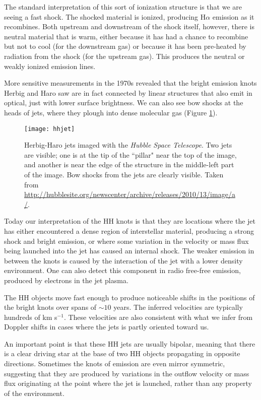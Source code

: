 The standard interpretation of this sort of ionization structure is that we are seeing a fast shock. The shocked material is ionized, producing H$\alpha$ emission as it recombines. Both upstream and downstream of the shock itself, however, there is neutral material that is warm, either because it has had a chance to recombine but not to cool (for the downstream gas) or because it has been pre-heated by radiation from the shock (for the upstream gas). This produces the neutral or weakly ionized emission lines.

More sensitive measurements in the 1970s revealed that the bright emission knots Herbig and Haro saw are in fact connected by linear structures that also emit in optical, just with lower surface brightness. We can also see bow shocks at the heads of jets, where they plough into dense molecular gas (Figure \ref{fig:hhjet}).

\begin{figure}
\texttt{[image: hhjet]}
\caption[Herbig-Haro jets from \textit{HST}]{
\label{fig:hhjet}
Herbig-Haro jets imaged with the \textit{Hubble Space Telescope}. Two jets are visible; one is at the tip of the ``pillar" near the top of the image, and another is near the edge of the structure in the middle-left part of the image. Bow shocks from the jets are clearly visible. Taken from \url{http://hubblesite.org/newscenter/archive/releases/2010/13/image/a/}.
}
\end{figure}

Today our interpretation of the HH knots is that they are locations where the jet has either encountered a dense region of interstellar material, producing a strong shock and bright emission, or where some variation in the velocity or mass flux being launched into the jet has caused an internal shock. The weaker emission in between the knots is caused by the interaction of the jet with a lower density environment. One can also detect this component in radio free-free emission, produced by electrons in the jet plasma.

The HH objects move fast enough to produce noticeable shifts in the positions of the bright knots over spans of $\sim 10$ years. The inferred velocities are typically hundreds of km s$^{-1}$. These velocities are also consistent with what we infer from Doppler shifts in cases where the jets is partly oriented toward us.

An important point is that these HH jets are usually bipolar, meaning that there is a clear driving star at the base of two HH objects propagating in opposite directions. Sometimes the knots of emission are even mirror symmetric, suggesting that they are produced by variations in the outflow velocity or mass flux originating at the point where the jet is launched, rather than any property of the environment.


